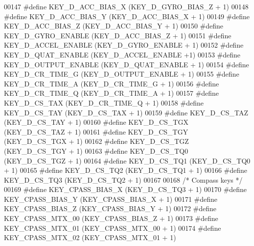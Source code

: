 \begin{DoxyCode}
00147 \textcolor{preprocessor}{#define KEY\_D\_ACC\_BIAS\_X                (KEY\_D\_GYRO\_BIAS\_Z + 1)}
00148 \textcolor{preprocessor}{#define KEY\_D\_ACC\_BIAS\_Y                (KEY\_D\_ACC\_BIAS\_X + 1)}
00149 \textcolor{preprocessor}{#define KEY\_D\_ACC\_BIAS\_Z                (KEY\_D\_ACC\_BIAS\_Y + 1)}
00150 \textcolor{preprocessor}{#define KEY\_D\_GYRO\_ENABLE               (KEY\_D\_ACC\_BIAS\_Z + 1)}
00151 \textcolor{preprocessor}{#define KEY\_D\_ACCEL\_ENABLE              (KEY\_D\_GYRO\_ENABLE + 1)}
00152 \textcolor{preprocessor}{#define KEY\_D\_QUAT\_ENABLE               (KEY\_D\_ACCEL\_ENABLE +1)}
00153 \textcolor{preprocessor}{#define KEY\_D\_OUTPUT\_ENABLE             (KEY\_D\_QUAT\_ENABLE + 1)}
00154 \textcolor{preprocessor}{#define KEY\_D\_CR\_TIME\_G                 (KEY\_D\_OUTPUT\_ENABLE + 1)}
00155 \textcolor{preprocessor}{#define KEY\_D\_CR\_TIME\_A                 (KEY\_D\_CR\_TIME\_G + 1)}
00156 \textcolor{preprocessor}{#define KEY\_D\_CR\_TIME\_Q                 (KEY\_D\_CR\_TIME\_A + 1)}
00157 \textcolor{preprocessor}{#define KEY\_D\_CS\_TAX                    (KEY\_D\_CR\_TIME\_Q + 1)}
00158 \textcolor{preprocessor}{#define KEY\_D\_CS\_TAY                    (KEY\_D\_CS\_TAX + 1)}
00159 \textcolor{preprocessor}{#define KEY\_D\_CS\_TAZ                    (KEY\_D\_CS\_TAY + 1)}
00160 \textcolor{preprocessor}{#define KEY\_D\_CS\_TGX                    (KEY\_D\_CS\_TAZ + 1)}
00161 \textcolor{preprocessor}{#define KEY\_D\_CS\_TGY                    (KEY\_D\_CS\_TGX + 1)}
00162 \textcolor{preprocessor}{#define KEY\_D\_CS\_TGZ                    (KEY\_D\_CS\_TGY + 1)}
00163 \textcolor{preprocessor}{#define KEY\_D\_CS\_TQ0                    (KEY\_D\_CS\_TGZ + 1)}
00164 \textcolor{preprocessor}{#define KEY\_D\_CS\_TQ1                    (KEY\_D\_CS\_TQ0 + 1)}
00165 \textcolor{preprocessor}{#define KEY\_D\_CS\_TQ2                    (KEY\_D\_CS\_TQ1 + 1)}
00166 \textcolor{preprocessor}{#define KEY\_D\_CS\_TQ3                    (KEY\_D\_CS\_TQ2 + 1)}
00167 
00168 \textcolor{comment}{/* Compass keys */}
00169 \textcolor{preprocessor}{#define KEY\_CPASS\_BIAS\_X            (KEY\_D\_CS\_TQ3 + 1)}
00170 \textcolor{preprocessor}{#define KEY\_CPASS\_BIAS\_Y            (KEY\_CPASS\_BIAS\_X + 1)}
00171 \textcolor{preprocessor}{#define KEY\_CPASS\_BIAS\_Z            (KEY\_CPASS\_BIAS\_Y + 1)}
00172 \textcolor{preprocessor}{#define KEY\_CPASS\_MTX\_00            (KEY\_CPASS\_BIAS\_Z + 1)}
00173 \textcolor{preprocessor}{#define KEY\_CPASS\_MTX\_01            (KEY\_CPASS\_MTX\_00 + 1)}
00174 \textcolor{preprocessor}{#define KEY\_CPASS\_MTX\_02            (KEY\_CPASS\_MTX\_01 + 1)}

\end{DoxyCode}
